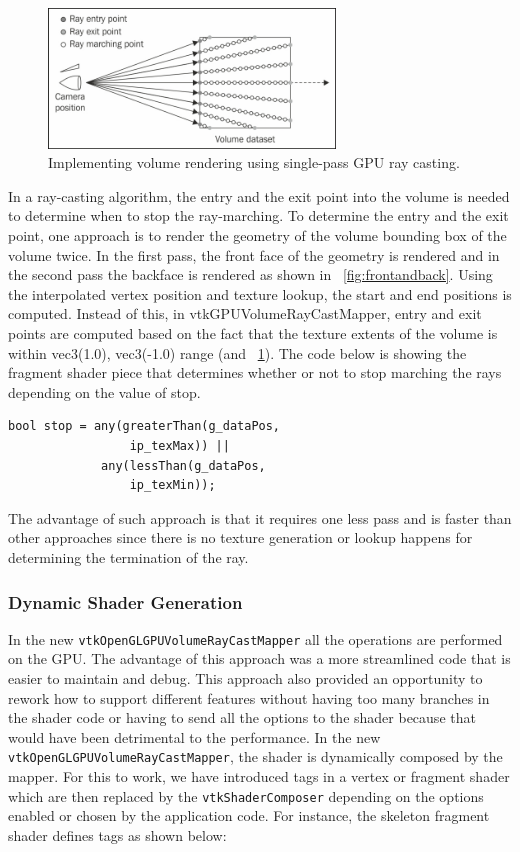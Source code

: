 \begin{figure}
\centering
\includegraphics[width=3in]{raycasting.jpg}
\caption{Implementing volume rendering using single-pass GPU ray casting.}
\label{fig:raycasting}
\end{figure}

In a ray-casting algorithm, the entry and the exit point into the volume is needed to determine when to stop the ray-marching. To determine the entry and the exit point, one approach is to render the geometry of the volume bounding box of the volume twice. In the first pass, the front face of the geometry is rendered and in the second pass the backface is rendered as shown in ~\ref{fig:frontandback}. Using the interpolated vertex position and texture lookup, the start and end positions is computed. Instead of this, in vtkGPUVolumeRayCastMapper, entry and exit points are computed based on the fact that the texture extents of the volume is within vec3(1.0), vec3(-1.0) range (and ~\ref{fig:raycasting}). The code below is showing the fragment shader piece that determines whether or not to stop marching the rays depending on the value of stop.
 
 \begin{lstlisting}[breaklines=true]
 bool stop = any(greaterThan(g_dataPos, 
                 ip_texMax)) ||
             any(lessThan(g_dataPos, 
                 ip_texMin));
 \end{lstlisting}
 
 The advantage of such approach is that it requires one less pass and is faster than other approaches since there is no texture generation or lookup happens for determining the termination of the ray.
 
 
\subsubsection{Dynamic Shader Generation}
In the new \texttt{vtkOpenGLGPUVolumeRayCastMapper} all the operations are performed on the GPU. The advantage of this approach was a more streamlined code that is easier to maintain and debug. This approach also provided an opportunity to rework how to support different features without having too many branches in the shader code or having to send all the options to the shader because that would have been detrimental to the performance. In the new \texttt{vtkOpenGLGPUVolumeRayCastMapper}, the shader is dynamically composed by the mapper. For this to work, we have introduced tags in a vertex or fragment shader which are then replaced by the \texttt{vtkShaderComposer} depending on the options enabled or chosen by the application code. For instance, the skeleton fragment shader defines tags as shown below:
 
